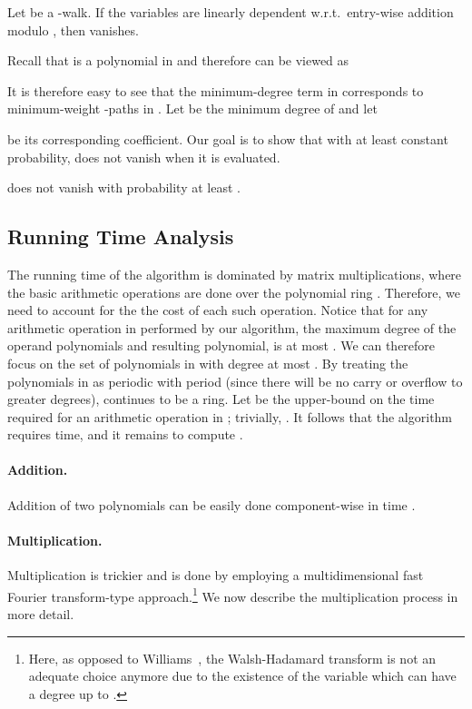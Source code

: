 \documentclass{llncs}
\begin{document}
\begin{proposition}\label{thr:dependent}
Let  be a -walk. If the variables  are linearly dependent w.r.t.\ entry-wise addition modulo , then  vanishes.
\end{proposition}

Recall that  is a polynomial in  and therefore can be viewed as

It is therefore easy to see that the minimum-degree term in  corresponds to minimum-weight -paths in . Let  be the minimum degree of  and let 

 be its corresponding coefficient.
Our goal is to show that with at least constant probability,  does not vanish when it is evaluated.
\begin{proposition}\label{pro:high-pro}
 does not vanish with probability at least .
\end{proposition}
\subsection{Running Time Analysis}
The running time of the algorithm is dominated by  matrix multiplications, where the basic arithmetic operations are done over the polynomial ring .  Therefore, we need to account for the the cost of each such operation. Notice that for any arithmetic operation in  performed by our algorithm, the maximum degree of the operand polynomials and resulting polynomial, is at most . 
We can therefore focus on the set  of polynomials in  with degree at most . By treating the polynomials in  as periodic with period  (since there will be no carry or overflow to greater degrees),  continues to be a ring. 
Let  be the upper-bound on the time required for an arithmetic operation in ; trivially, . It follows that the algorithm requires  time, and it remains to compute .

\paragraph{Addition.} Addition of two polynomials can be easily done component-wise in time . 
\paragraph{Multiplication.} Multiplication is trickier and is done by employing a multidimensional fast Fourier transform-type approach.\footnote{Here, as opposed to Williams~\cite{Williams09}, the Walsh-Hadamard transform is not an adequate choice anymore due to the existence of the variable  which can have a degree up to . } We now describe the multiplication process in more detail.
\end{document}
